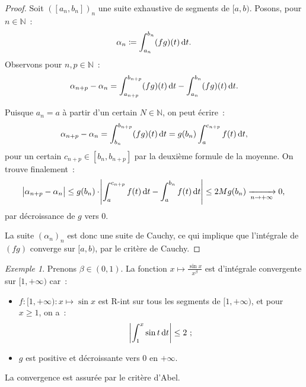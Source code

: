 \documentclass{report}
\theoremstyle{definition}
\theoremstyle{remark}
\newtheorem{ex}{Exemple}[chapter]
\numberwithin{equation}{section}
\newcommand{\N}{\mathbb N}
\newcommand{\pinfty}{{+\infty}}
\begin{document}
			\begin{proof} Soit $([a_n, b_n])_n$ une suite exhaustive de segments de $[a, b)$. Posons, pour $n \in \N$~:
			\begin{equation}
				\alpha_n \coloneqq \int_{a_n}^{b_n}(fg)(t)\dif t.
			\end{equation}
			Observons pour $n, p \in \N$~:
			\begin{equation}
				\alpha_{n+p} - \alpha_n = \int_{a_{n+p}}^{b_{n+p}}(fg)(t)\dif t - \int_{a_n}^{b_n}(fg)(t)\dif t.
			\end{equation}

			Puisque $a_n = a$ à partir d'un certain $N \in \N$, on peut écrire~:
			\begin{equation}
				\alpha_{n+p} - \alpha_n = \int_{b_n}^{b_{n+p}}(fg)(t)\dif t = g(b_n)\int_a^{c_{n+p}}f(t)\dif t,
			\end{equation}
			pour un certain $c_{n+p} \in [b_n, b_{n+p}]$ par la deuxième formule de la moyenne. On trouve finalement~:
			\begin{equation}
				\abs {\alpha_{n+p} - \alpha_n} \leq g(b_n) \cdot \abs {\int_a^{c_{n+p}}f(t)\dif t - \int_a^{b_n}f(t)\dif t} \leq 2Mg(b_n) \xrightarrow[n \to \pinfty]{} 0,
			\end{equation}
			par décroissance de $g$ vers $0$.

			La suite $(\alpha_n)_n$ est donc une suite de Cauchy, ce qui implique que l'intégrale de $(fg)$ converge sur $[a, b)$, par le critère de Cauchy.
			\end{proof}

			\begin{ex} Prenons $\beta \in (0, 1)$. La fonction $x \mapsto \frac {\sin x}{x^\beta}$ est d'intégrale convergente sur $[1, \pinfty)$ car~:
			\begin{itemize}
				\item $f : [1, \pinfty) : x \mapsto \sin x$ est R-int sur tous les segments de $[1, \pinfty)$, et pour $x \geq 1$, on a~:
				\begin{equation}
					\abs {\int_1^x\sin t\dif t} \leq 2~;
				\end{equation}
				\item $g$ est positive et décroissante vers $0$ en $\pinfty$.
			\end{itemize}

			La convergence est assurée par le critère d'Abel.
			\end{ex}
\end{document}
